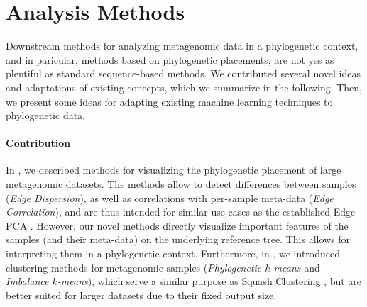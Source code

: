 
\section{Analysis Methods}
\label{ch:ConclusionOutlook:sec:AnalysisMethods}

Downstream methods for analyzing metagenomic data in a phylogenetic context,
and in paricular, methods based on phylogenetic placements,
are not yes as plentiful as standard sequence-based methods.
We contributed several novel ideas and adaptations of existing concepts,
which we summarize in the following.
Then, we present some ideas for adapting existing machine learning techniques to phylogenetic data.

\paragraph{Contribution}
\label{ch:ConclusionOutlook:sec:AnalysisMethods:par:Contribution}

In , we described methods for visualizing the phylogenetic placement of large metagenomic datasets.
The methods allow to detect differences between samples (\emph{Edge Dispersion}),
as well as correlations with per-sample meta-data (\emph{Edge Correlation}),
and are thus intended for similar use cases as the established Edge PCA \cite{Matsen2011a}.
However, our novel methods directly visualize important features of the samples (and their meta-data)
on the underlying reference tree.
This allows for interpreting them in a phylogenetic context.
Furthermore, in , we introduced clustering methods for metagenomic samples
(\emph{Phylogenetic $k$-means} and \emph{Imbalance $k$-means}),
which serve a similar purpose as Squash Clustering \cite{Matsen2011a},
but are better suited for larger datasets due to their fixed output size.

